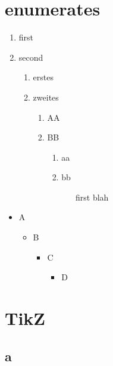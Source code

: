 \documentclass[a4paper]{scrartcl}
\begin{document}
	\newpage
		
	\section{enumerates}
		\begin{enumerate}[noitemsep]
			\item first
			\item second
			\begin{enumerate}
				\item erstes
				\item zweites
				\begin{enumerate}
					\item AA
					\item BB
					\begin{enumerate}
						\item aa
						\item bb
						\begin{itemize}
							\item[first] blah
						\end{itemize}
					\end{enumerate}
				\end{enumerate}
			\end{enumerate}
		\end{enumerate}
		\begin{itemize}
			\item A
			\begin{itemize}
				\item B 
				\begin{itemize}
					\item C 
					\begin{itemize}
						\item D 
					\end{itemize}
				\end{itemize}
			\end{itemize}			
		\end{itemize}
	
	\section{TikZ}
		\subsection{a}
			
\end{document}
